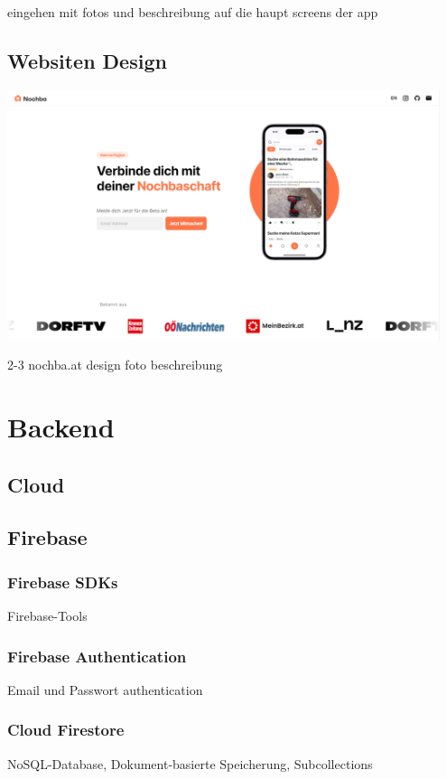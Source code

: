 eingehen mit fotos und beschreibung auf die haupt screens der app

\subsection{Websiten Design}
\includegraphics[width=0.95\textwidth]{pics/website-design.png}


2-3 nochba.at design foto
beschreibung

\section{Backend}
\subsection{Cloud}
\author{Martin Hausleitner}

\subsection{Firebase}
\author{Martin Hausleitner}

\subsubsection{Firebase SDKs}
\author{Sandin Habibovic}
Firebase-Tools

\subsubsection{Firebase Authentication}
\author{Sandin Habibovic}
Email und Passwort authentication

\subsubsection{Cloud Firestore}
\author{Sandin Habibovic}
NoSQL-Database, Dokument-basierte Speicherung, Subcollections
